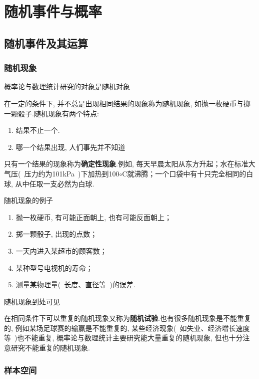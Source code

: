 \chapter{随机事件与概率}
\section{随机事件及其运算}
\subsection{随机现象}

概率论与数理统计研究的对象是随机对象

在一定的条件下, 并不总是出现相同结果的现象称为随机现象, 如抛一枚硬币与掷一颗骰子.随机现象有两个特点: 

\begin{enumerate}
	\item 结果不止一个.
	\item 哪一个结果出现, 人们事先并不知道
\end{enumerate}

只有一个结果的现象称为\textbf{确定性现象}.例如, 每天早晨太阳从东方升起；水在标准大气压(~压力约为101kPa~)下加热到100$\circ$C就沸腾；一个口袋中有十只完全相同的白球, 从中任取一支必然为白球.

\begin{example}
	
	随机现象的例子
	
	\begin{enumerate}
		\item 抛一枚硬币, 有可能正面朝上, 也有可能反面朝上；
		\item 掷一颗骰子, 出现的点数；
		\item 一天内进入某超市的顾客数；
		\item 某种型号电视机的寿命；
		\item 测量某物理量(~长度、直径等~)的误差.
	\end{enumerate}
	\label{exam:1.1.1}
\end{example}

随机现象到处可见
	
在相同条件下可以重复的随机现象又称为\textbf{随机试验}.也有很多随机现象是不能重复的, 例如某场足球赛的输赢是不能重复的, 某些经济现象(~如失业、经济增长速度等~)也不能重复, 概率论与数理统计主要研究能大量重复的随机现象, 但也十分注意研究不能重复的随机现象.
	
\subsection{样本空间}
	
